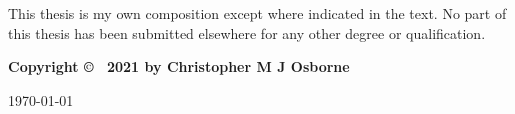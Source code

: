 
\thispagestyle{empty}

\newpage\markboth{}{}

\vspace*{4cm}
\begin{flushright}
\parbox{130mm}{
\hrulefill

This thesis is my own composition except where indicated in
the text. No part of this thesis has been submitted elsewhere for any other degree
or qualification.
\vspace*{1cm}

{\bf Copyright © ~2021 by Christopher M J Osborne}
\vspace*{0.4cm}

\today

\hrulefill{}}
\end{flushright}
